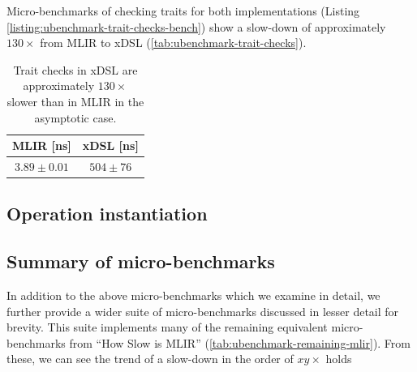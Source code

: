 Micro-benchmarks of checking traits for both implementations (Listing \ref{listing:ubenchmark-trait-checks-bench}) show a slow-down of approximately $130\times$ from MLIR to xDSL (\autoref{tab:ubenchmark-trait-checks}).

\begin{table}[H]
  \caption{Trait checks in xDSL are approximately $130\times$ slower than in MLIR in the asymptotic case.} %
  \label{tab:ubenchmark-trait-checks}
  \centering
  \begin{tabular}{cc}
    \toprule
    \textbf{MLIR [ns]} & \textbf{xDSL [ns]}\\
    \midrule
    $3.89 \pm 0.01$ & $504 \pm 76$ \\
    \bottomrule
  \end{tabular}
\end{table}




\subsection{Operation instantiation}

\subsection{Summary of micro-benchmarks}

In addition to the above micro-benchmarks which we examine in detail, we further provide a wider suite of micro-benchmarks discussed in lesser detail for brevity. %
This suite implements many of the remaining equivalent micro-benchmarks from ``How Slow is MLIR'' (\autoref{tab:ubenchmark-remaining-mlir}).
From these, we can see the trend of a slow-down in the order of $xy\times$ holds 

